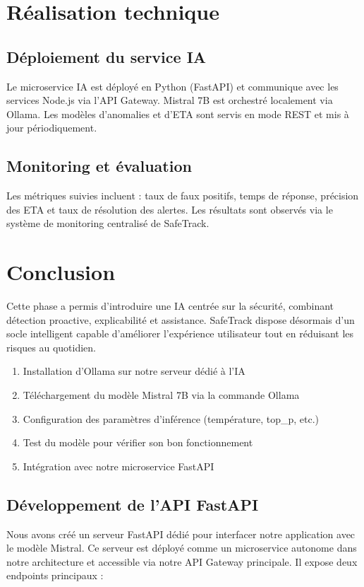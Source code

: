 \section{Réalisation technique}

\subsection{Déploiement du service IA}
Le microservice IA est déployé en Python (FastAPI) et communique avec les services Node.js via l'API Gateway. Mistral 7B est orchestré localement via Ollama. Les modèles d'anomalies et d'ETA sont servis en mode REST et mis à jour périodiquement.

\subsection{Monitoring et évaluation}
Les métriques suivies incluent : taux de faux positifs, temps de réponse, précision des ETA et taux de résolution des alertes. Les résultats sont observés via le système de monitoring centralisé de SafeTrack.

\section*{Conclusion}
Cette phase a permis d'introduire une IA centrée sur la sécurité, combinant détection proactive, explicabilité et assistance. SafeTrack dispose désormais d'un socle intelligent capable d'améliorer l'expérience utilisateur tout en réduisant les risques au quotidien.

\begin{enumerate}
    \item Installation d'Ollama sur notre serveur dédié à l'IA
    \item Téléchargement du modèle Mistral 7B via la commande Ollama
    \item Configuration des paramètres d'inférence (température, top\_p, etc.)
    \item Test du modèle pour vérifier son bon fonctionnement
    \item Intégration avec notre microservice FastAPI
\end{enumerate}

\subsection{Développement de l'API FastAPI}
Nous avons créé un serveur FastAPI dédié pour interfacer notre application avec le modèle Mistral. Ce serveur est déployé comme un microservice autonome dans notre architecture et accessible via notre API Gateway principale. Il expose deux endpoints principaux :

